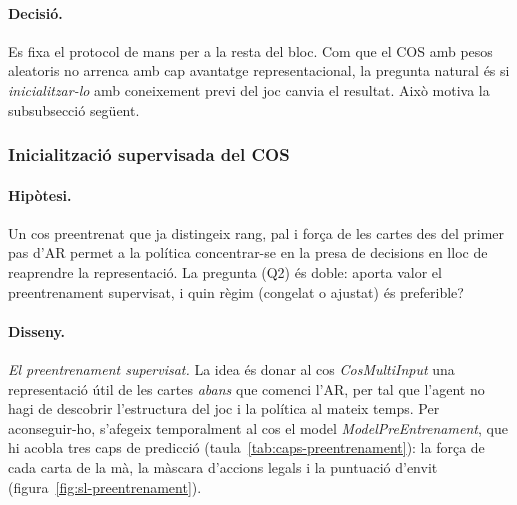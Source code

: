 \paragraph{Decisió.} Es fixa el protocol de mans per a la resta del bloc. Com que el COS
amb pesos aleatoris no arrenca amb cap avantatge representacional, la pregunta natural és
si \emph{inicialitzar-lo} amb coneixement previ del joc canvia el resultat. Això motiva la
subsubsecció següent.

\subsubsection{Inicialització supervisada del COS}
\label{sec:fase3-init}

\paragraph{Hipòtesi.} Un cos preentrenat que ja distingeix rang, pal i força de les
cartes des del primer pas d'\ac{AR} permet a la política concentrar-se en la presa de
decisions en lloc de reaprendre la representació. La pregunta (Q2) és doble: aporta valor el
preentrenament supervisat, i quin règim (congelat o ajustat) és preferible?

\paragraph{Disseny.}

\emph{El preentrenament supervisat.} La idea és donar al cos \emph{CosMultiInput}
una representació útil de les cartes \emph{abans} que comenci l'\ac{AR}, per tal que
l'agent no hagi de descobrir l'estructura del joc i la política al mateix temps. Per
aconseguir-ho, s'afegeix temporalment al cos el model \emph{ModelPreEntrenament}, que
hi acobla tres caps de predicció (taula~\ref{tab:caps-preentrenament}): la força de cada
carta de la mà, la màscara d'accions legals i la puntuació d'envit
(figura~\ref{fig:sl-preentrenament}).

